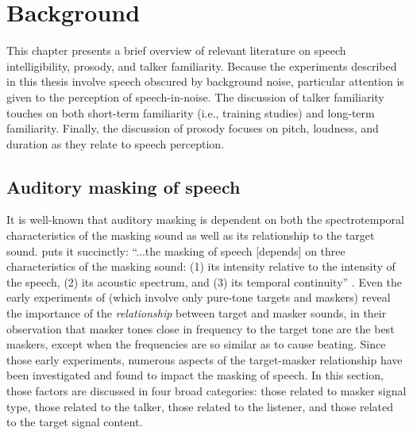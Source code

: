 \chapter{Background}
This chapter presents a brief overview of relevant literature on speech intelligibility, prosody, and talker familiarity.  Because the experiments described in this thesis involve speech obscured by background noise, particular attention is given to the perception of speech-in-noise.  The discussion of talker familiarity touches on both short-term familiarity (i.e., training studies) and long-term familiarity.  Finally, the discussion of prosody focuses on pitch, loudness, and duration as they relate to speech perception.

\section{Auditory masking of speech}
It is well-known that auditory masking is dependent on both the spectrotemporal characteristics of the masking sound as well as its relationship to the target sound.  \citet{Miller1947} puts it succinctly: “...the masking of speech [depends] on three characteristics of the masking sound: (1) its intensity relative to the intensity of the speech, (2) its acoustic spectrum, and (3) its temporal continuity” \citep[106]{Miller1947}.  Even the early experiments of \citet{WegelLane1924} (which involve only pure-tone targets and maskers) reveal the importance of the \emph{relationship} between target and masker sounds, in their observation that masker tones close in frequency to the target tone are the best maskers, except when the frequencies are so similar as to cause beating.  
Since those early experiments, numerous aspects of the target-masker relationship have been investigated and found to impact the masking of speech.  In this section, those factors are discussed in four broad categories: those related to masker signal type, those related to the talker, those related to the listener, and those related to the target signal content.

